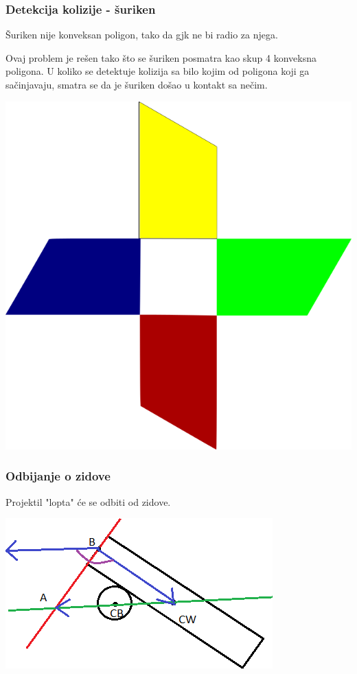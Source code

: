 \documentclass{beamer}
\begin{document}
\begin{frame}
	\frametitle{Detekcija kolizije - šuriken}
	Šuriken nije konveksan poligon, tako da gjk ne bi radio za njega.

	Ovaj problem je rešen tako što se šuriken posmatra kao skup 4 konveksna poligona. U koliko se detektuje kolizija sa bilo kojim od poligona koji ga sačinjavaju, smatra se da je šuriken došao u kontakt sa nečim.
	
	\vspace{0.4cm}
	\begin{center}
		\includegraphics[scale=0.3]{./images/shuriken.png}
	\end{center}
\end{frame}

\begin{frame}
	\frametitle{Odbijanje o zidove}
	Projektil "lopta" će se odbiti od zidove.
	
	\includegraphics[scale=0.75]{./images/odbijanje3.png}
\end{frame}
\end{document}
